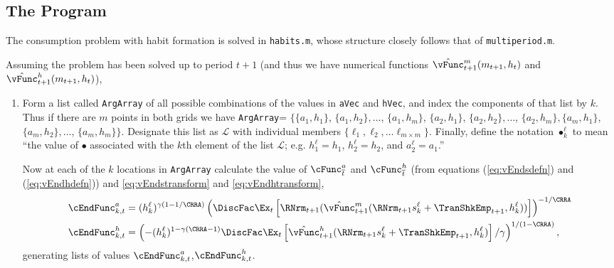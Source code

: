 \documentclass[titlepage, headings=optiontotocandhead]{\econtex}
\begin{document}
{  \hypertarget{The-Program}{}
  \subsection{The Program}
  The consumption problem with habit formation is solved in
  \texttt{habits.m}, whose structure closely follows that of
  \texttt{multiperiod.m}.

  Assuming the problem has been solved up to period $t+1$ (and thus we
  have numerical functions $\hat{\vFunc}_{t+1}^{m}({m}_{t+1},h_{t})$ and
  $\hat{\vFunc}_{t+1}^{h}({m}_{t+1},h_{t})$),
  \begin{enumerate}

  \item Form a list called \texttt{ArgArray} of all possible
    combinations of the values in \texttt{aVec} and
    \texttt{hVec}, and index the components of that list by $k$.  Thus
    if there are $m$ points in both grids we have \texttt{ArgArray}=
    $\{\{{a}_{1},h_{1}\}$, $\{{a}_{1},h_{2}\},\ldots$,
    $\{{a}_{1},h_{m}\}$, $\{{a}_{2},h_{1}\}$,
    $\{{a}_{2},h_{2}\},\ldots$, $\{{a}_{2},h_{m}\},
    \{{a}_{m},h_{1}\}$, $\{{a}_{m},h_{2}\},\ldots$,
    $\{{a}_{m},h_{m}\}\}$.  Designate this list as $\mathcal{L}$
    with individual members $\{\ell_{1}, \ell_{2}, \ldots \ell_{m \times
      m}\}$.  Finally, define the notation $\bullet^{\ell}_{k}$ to mean
    ``the value of $\bullet$ associated with the $k$th element of the
    list $\mathcal{L}$; e.g. $h^{\ell}_{1} = h_{1}$, $h^{\ell}_{2} =
    h_{2}$, and ${a}^{\ell}_{2}={a}_{1}$.''

    Now at each of the $k$ locations in \texttt{ArgArray} calculate the
    value of $\cFunc_{\overline{t}}^{{a}}$ and $\cFunc_{\overline{t}}^{h}$ (from
    equations (\ref{eq:vEndsdefn}) and (\ref{eq:vEndhdefn})) and
    \eqref{eq:vEndstransform} and \eqref{eq:vEndhtransform},
    \begin{equation}\begin{gathered}\begin{aligned}
          \cEndFunc_{k,t}^{{a}}  & = (h_{k}^{\ell})^{\gamma(1-1/\CRRA)}
          \left(\DiscFac \Ex_{t}
            \left[
              \RNrm_{t+1} (\hat{\vFunc}_{t+1}^{m}(\RNrm_{t+1} s^{\ell}_{k} +
              {\TranShkEmp}_{t+1},h^{\ell}_{k}))
            \right]
          \right)^{-1/\CRRA}
          \\      \cEndFunc_{k,t}^{h} 
          & =                                         \left(-(h_{k}^{\ell})^{1-\gamma(\CRRA-1)} \DiscFac \Ex_{t}
            \left[
              \hat{\vFunc}_{t+1}^{h}(\RNrm_{t+1} s^{\ell}_{k} +
              {\TranShkEmp}_{t+1},h^{\ell}_{k})
            \right]/\gamma
          \right)^{1/(1-\CRRA)},
        \end{aligned}\end{gathered}\end{equation}
    generating lists of values
    $\cEndFunc^{a}_{k,t}$,$\cEndFunc^{h}_{k,t}$.


\end{enumerate}}
\end{document}
